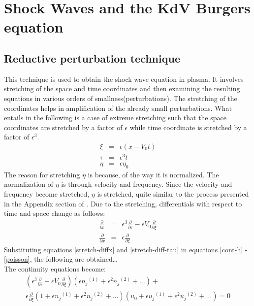 \documentclass[a4paper, 12pt]{article}
\begin{document}
\section{Shock Waves and the KdV Burgers equation}
\subsection{Reductive perturbation technique}
This technique is used to obtain the shock wave equation in plasma. It involves stretching of the space and time coordinates and then examining the resulting equations in various
orders of smallness(perturbations). The stretching of the coordinates helps in amplification of the already small perturbations. What entails in the following is a case of extreme stretching
such that the space coordinates are stretched by a factor of $\epsilon$ while time coordinate is stretched by a factor of $\epsilon^3$.
\begin{eqnarray}
    \xi &=& \epsilon(x - V_0 t) \label{stretchx}\\
    \tau &=& \epsilon^3 t \label{stretcht}\\
    \eta &=& \epsilon \eta_0 \label{stretcheta}
\end{eqnarray}
The reason for stretching $\eta$ is because, of the way it is normalized. The normalization of $\eta$ is through velocity and frequency. Since the velocity and frequency become stretched, $\eta$ is stretched, quite similar to the process presented in the Appendix section of \cite{jyoti2020}.
Due to the stretching, differentials with respect to time and space change as follows:
\begin{eqnarray}
    \frac{\partial}{\partial t} &=& \epsilon^3 \frac{\partial}{\partial \tau} - \epsilon V_0 \frac{\partial}{\partial \xi} \label{stretch-diff-tau}\\
    \frac{\partial}{\partial x} &=& \epsilon \frac{\partial}{\partial \xi} \label{stretch-diffx}
\end{eqnarray}
Substituting equations \ref{stretch-diffx} and \ref{stretch-diff-tau} in equations \ref{cont-h} - \ref{poisson}, the following are obtained\dots\\
The continuity equations become:
\begin{equation}
    \begin{split}
        (\epsilon^3 \frac{\partial}{\partial \tau} - \epsilon V_0 \frac{\partial}{\partial \xi})(\epsilon {n_j}^{(1)} + \epsilon^2 {n_j}^{(2)} + \dots) +\\
        \epsilon \frac{\partial}{\partial \xi}(1 + \epsilon {n_j}^{(1)} + \epsilon^2 {n_j}^{(2)} + \dots)(u_0 + \epsilon {u_j}^{(1)} + \epsilon^2 {u_j}^{(2)} + \dots)
        =0    
    \end{split}
\end{equation}
\end{document}
